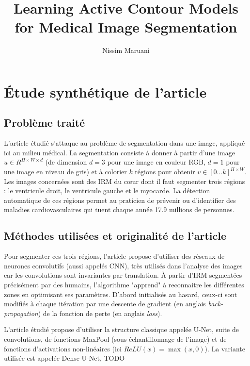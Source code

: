 \documentclass{article}
\title{Learning Active Contour Models for Medical Image Segmentation}
\author{Nissim Maruani}
\begin{document}
\maketitle

\section{Étude synthétique de l'article}


\subsection{Problème traité}

L'article étudié s'attaque au problème de segmentation dans une image, appliqué ici au milieu médical. La segmentation consiste à donner à partir d'une image $u \in R^{H \times W \times d}$ (de dimension $d=3$ pour une image en couleur RGB, $d=1$ pour une image en niveau de gris) et à colorier $k$ régions pour obtenir $v \in [0... k]^{H \times W}$. Les images concernées sont des IRM du cœur dont il faut segmenter trois régions : le ventricule droit, le ventricule gauche et le myocarde. La détection automatique de ces régions permet au praticien de prévenir ou d'identifier des maladies cardiovasculaires qui tuent chaque année 17.9 millions de personnes. 

\subsection{Méthodes utilisées et originalité de l'article}

Pour segmenter ces trois régions, l'article propose d'utiliser des réseaux de neurones convolutifs (aussi appelés CNN), très utilisés dans l'analyse des images car les convolutions sont invariantes par translation. À partir d'IRM segmentées précisément par des humains, l'algorithme "apprend" à reconnaitre les différentes zones en optimisant ses paramètres. D'abord initialisés au hasard, ceux-ci sont modifiés à chaque itération par une descente de gradient (en anglais \textit{back-propagation}) de la fonction de perte (en anglais \textit{loss}). 

L'article étudié propose d'utiliser la structure classique appelée U-Net, suite de convolutions, de fonctions MaxPool (sous échantillonnage de l'image) et de fonctions d'activations non-linéaires (ici $ReLU(x) = \max(x, 0)$). La variante utilisée est appelée Dense U-Net, TODO
\end{document}
